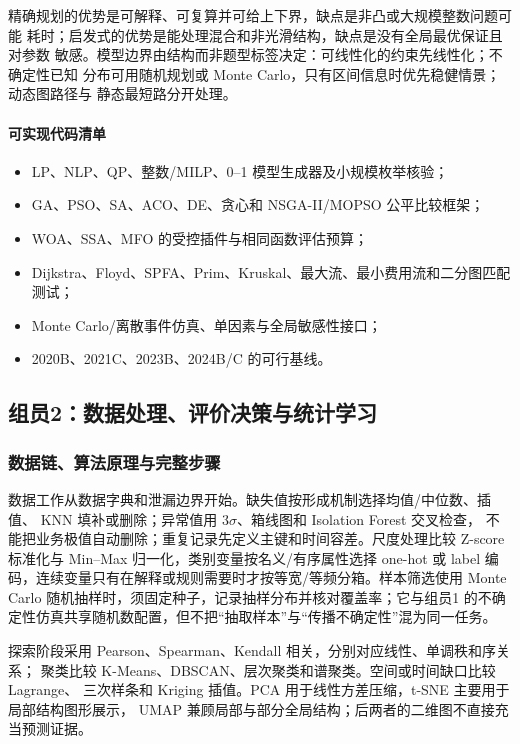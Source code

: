 \documentclass[UTF8,a4paper,12pt]{ctexart}
\begin{document}
精确规划的优势是可解释、可复算并可给上下界，缺点是非凸或大规模整数问题可能
耗时；启发式的优势是能处理混合和非光滑结构，缺点是没有全局最优保证且对参数
敏感。模型边界由结构而非题型标签决定：可线性化的约束先线性化；不确定性已知
分布可用随机规划或 Monte Carlo，只有区间信息时优先稳健情景；动态图路径与
静态最短路分开处理。

\paragraph{可实现代码清单}
\begin{itemize}
  \item LP、NLP、QP、整数/MILP、0--1 模型生成器及小规模枚举核验；
  \item GA、PSO、SA、ACO、DE、贪心和 NSGA-II/MOPSO 公平比较框架；
  \item WOA、SSA、MFO 的受控插件与相同函数评估预算；
  \item Dijkstra、Floyd、SPFA、Prim、Kruskal、最大流、最小费用流和二分图匹配测试；
  \item Monte Carlo/离散事件仿真、单因素与全局敏感性接口；
  \item 2020B、2021C、2023B、2024B/C 的可行基线。
\end{itemize}

\subsection{组员2：数据处理、评价决策与统计学习}

\subsubsection{数据链、算法原理与完整步骤}

数据工作从数据字典和泄漏边界开始。缺失值按形成机制选择均值/中位数、插值、
KNN 填补或删除；异常值用 $3\sigma$、箱线图和 Isolation Forest 交叉检查，
不能把业务极值自动删除；重复记录先定义主键和时间容差。尺度处理比较
Z-score 标准化与 Min--Max 归一化，类别变量按名义/有序属性选择 one-hot 或
label 编码，连续变量只有在解释或规则需要时才按等宽/等频分箱。样本筛选使用
Monte Carlo 随机抽样时，须固定种子，记录抽样分布并核对覆盖率；它与组员1
的不确定性仿真共享随机数配置，但不把“抽取样本”与“传播不确定性”混为同一任务。

探索阶段采用 Pearson、Spearman、Kendall 相关，分别对应线性、单调秩和序关系；
聚类比较 K-Means、DBSCAN、层次聚类和谱聚类。空间或时间缺口比较 Lagrange、
三次样条和 Kriging 插值。PCA 用于线性方差压缩，t-SNE 主要用于局部结构图形展示，
UMAP 兼顾局部与部分全局结构；后两者的二维图不直接充当预测证据。
\end{document}
